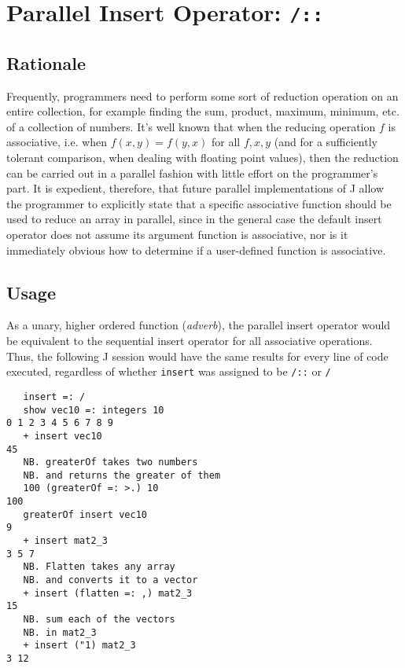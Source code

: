 \section{Parallel Insert Operator: \texttt{/::}}
\label{pins}
\subsection{Rationale}
Frequently, programmers need to perform some sort of reduction operation on an entire collection, 
for example finding the sum, product, maximum, minimum, etc. of a collection of numbers.
It's well known that when the reducing operation $f$ is associative, 
i.e. when $f(x,y) = f(y,x)$ for all $f, x, y$ (and for a sufficiently tolerant comparison, when dealing with floating point values),
then the reduction can be carried out in a parallel fashion with little effort on the programmer's part.
It is expedient, therefore, that future parallel implementations of J allow the programmer 
to explicitly state that a specific associative function should be used to reduce an array in parallel, 
since in the general case the default insert operator does not assume its argument function is associative, 
nor is it immediately obvious how to determine if a user-defined function is associative.

\subsection{Usage}
As a unary, higher ordered function (\textit{adverb}), 
the parallel insert operator would be equivalent to the sequential insert operator 
for all associative operations. 
Thus, the following J session would have the same results for every line of code executed, 
regardless of whether \texttt{insert} was assigned to be \texttt{/::} or \texttt{/}

\begin{singlespacing}
\begin{small}
\begin{verbatim}
   insert =: /
   show vec10 =: integers 10
0 1 2 3 4 5 6 7 8 9
   + insert vec10
45
   NB. greaterOf takes two numbers
   NB. and returns the greater of them
   100 (greaterOf =: >.) 10
100
   greaterOf insert vec10
9
   + insert mat2_3
3 5 7
   NB. Flatten takes any array
   NB. and converts it to a vector
   + insert (flatten =: ,) mat2_3
15
   NB. sum each of the vectors
   NB. in mat2_3
   + insert ("1) mat2_3
3 12
\end{verbatim}
\end{small}
\end{singlespacing}


